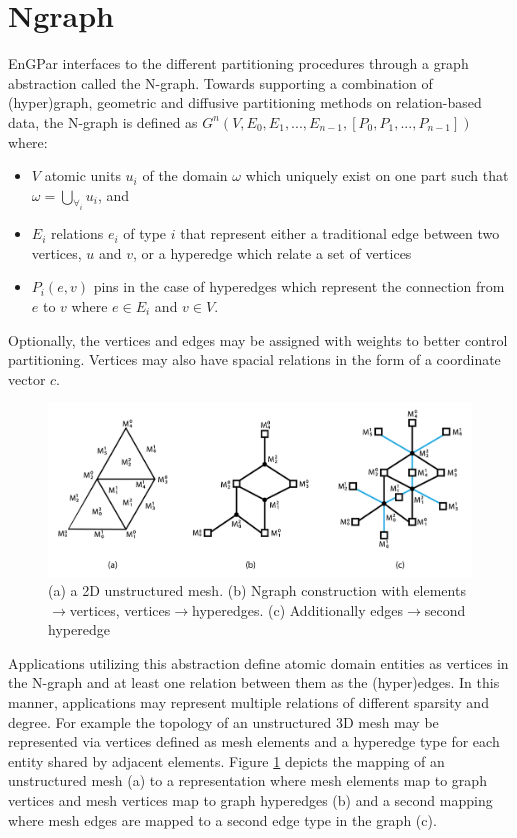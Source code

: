 \documentclass[a4paper]{article}
\begin{document}
\section{Ngraph}
EnGPar interfaces to the different partitioning procedures through a graph abstraction called the N-graph. Towards supporting a combination of (hyper)graph, geometric and diffusive partitioning methods on relation-based data, the N-graph is defined as $G^n(V,E_0,E_1,...,E_{n-1},[P_0,P_1,...,P_{n-1}])$ where:
\begin{itemize}
  \item $V$ atomic units $u_i$ of the domain $\omega$ which uniquely exist on one
    part such that $\omega = \bigcup_{\forall_i}u_i$, and 
  \item $E_i$ relations $e_i$ of type $i$ that represent either a traditional edge between two vertices, $u$ and $v$, or a hyperedge which relate a set of vertices
  \item $P_i(e,v)$ pins in the case of hyperedges which represent the connection
    from $e$ to $v$ where $e \in E_i$ and $v \in V$.
\end{itemize}
Optionally, the vertices and edges may be assigned with weights to better control partitioning. Vertices may also have spacial relations in the form of a coordinate vector $c$.


\begin{figure}[!ht]
  \centering
  \includegraphics[width=\textwidth]{exampleMesh2Graph.png}
  \caption{(a) a 2D unstructured mesh. (b) Ngraph construction with elements$\rightarrow$vertices, vertices$\rightarrow$hyperedges. (c) Additionally edges$\rightarrow$second hyperedge}
  \label{fig:Mesh2Graph}
\end{figure}

Applications utilizing this abstraction define atomic domain entities as vertices in the N-graph and at least one relation between them as the (hyper)edges. In this manner, applications may represent multiple relations of different sparsity and degree. For example the topology of an unstructured 3D mesh may be represented via vertices defined as mesh elements and a hyperedge type for each entity shared by adjacent elements. Figure \ref{fig:Mesh2Graph} depicts the mapping of an unstructured mesh (a) to a representation where mesh elements map to graph vertices and mesh vertices map to graph hyperedges (b) and a second mapping where mesh edges are mapped to a second edge type in the graph (c).
\end{document}
